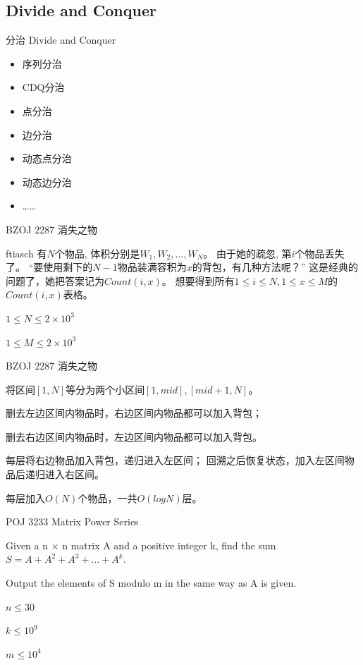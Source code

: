 \documentclass{beamer}
\begin{document}
\subsection{Divide and Conquer}

\begin{frame}{分治 Divide and Conquer}

    \begin{itemize}
        \item 序列分治
        \item CDQ分治
        \item 点分治
        \item 边分治
        \item 动态点分治
        \item 动态边分治
        \item ……
    \end{itemize}
    
\end{frame}

\begin{frame}{BZOJ 2287 消失之物}

    ftiasch 有$N$个物品, 体积分别是$W_1,W_2,...,W_N$。 
    由于她的疏忽, 第$i$个物品丢失了。 
    “要使用剩下的$N-1$物品装满容积为$x$的背包，有几种方法呢？” 
    这是经典的问题了，她把答案记为$Count(i, x)$。
    想要得到所有$1\leq i \leq N, 1 \leq x \leq M$的$Count(i,x)$表格。

    $1\leq N\leq 2\times 10^3$

    $1\leq M\leq 2\times 10^3$

\end{frame}

\begin{frame}{BZOJ 2287 消失之物}

    将区间$[1,N]$等分为两个小区间$[1,mid],[mid+1,N]$。

    删去左边区间内物品时，右边区间内物品都可以加入背包；

    删去右边区间内物品时，左边区间内物品都可以加入背包。

    每层将右边物品加入背包，递归进入左区间；
    回溯之后恢复状态，加入左区间物品后递归进入右区间。

    每层加入$O(N)$个物品，一共$O(logN)$层。
    
\end{frame}

\begin{frame}{POJ 3233 Matrix Power Series}
    
    Given a n × n matrix A and a positive integer k, find the sum $S = A + A^2 + A^3 + \ldots +A^k.$
    
    Output the elements of S modulo m in the same way as A is given.
    
    $n \leq 30$
    
    $k \leq 10^9$
    
    $m \leq 10^4$

\end{frame}
\end{document}
